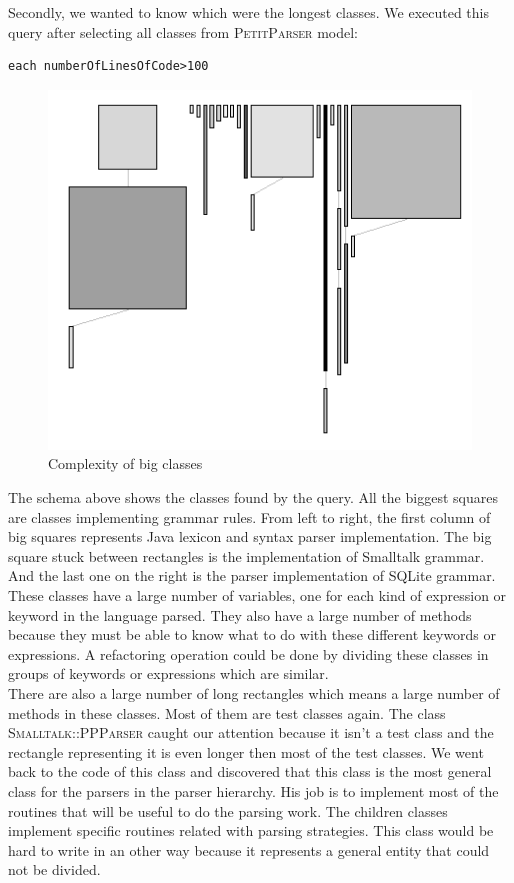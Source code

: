 Secondly, we wanted to know which were the longest classes. We executed this query after selecting all classes from \textsc{PetitParser} model:
\begin{lstlisting}
each numberOfLinesOfCode>100
\end{lstlisting}
\begin{figure}[ht]
\centering
\label{system_complexity_big_classes}
\includegraphics[scale=0.55]{system_complexity_big_methods.png}
\caption{Complexity of big classes}
\end{figure}
The schema above shows the classes found by the query. All the biggest squares are classes implementing grammar rules. From left to right, the first column of big squares represents Java lexicon and syntax parser implementation. The big square stuck between rectangles is the implementation of Smalltalk grammar. And the last one on the right is the parser implementation of SQLite grammar. These classes have a large number of variables, one for each kind of expression or keyword in the language parsed. They also have a large number of methods because they must be able to know what to do with these different keywords or expressions. A refactoring operation could be done by dividing these classes in groups of keywords or expressions which are similar.\\
There are also a large number of long rectangles which means a large number of methods in these classes. Most of them are test classes again. The class \textsc{Smalltalk::PPParser} caught our attention because it isn't a test class and the rectangle representing it is even longer then most of the test classes. We went back to the code of this class and discovered that this class is the most general class for the parsers in the parser hierarchy. His job is to implement most of the routines that will be useful to do the parsing work. The children classes implement specific routines related with parsing strategies. This class would be hard to write in an other way because it represents a general entity that could not be divided. 


